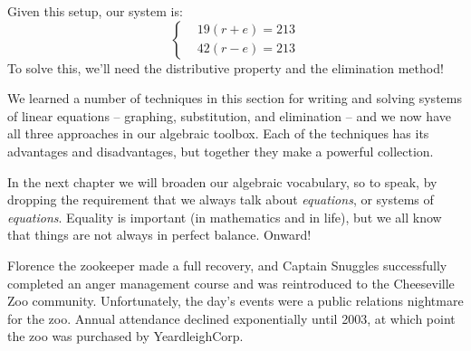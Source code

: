 %
%
%
Given this setup, our system is:
\[
\left\{%
\begin{aligned}
&19(r+e) = 213\\
&42(r-e) = 213
\end{aligned}
\right.
\]
To solve this, we'll need the distributive property and the elimination method!


\chaptersummary

We learned a number of techniques in this section for writing and solving systems of linear equations -- graphing, substitution, and elimination -- and we now have all three approaches in our algebraic toolbox. Each of the techniques has its advantages and disadvantages, but together they make a powerful collection.

In the next chapter we will broaden our algebraic vocabulary, so to speak, by dropping the requirement that we always talk about \textit{equations}, or systems of \textit{equations}. Equality is important (in mathematics and in life), but we all know that things are not always in perfect balance. Onward!

\bigskip
\begin{boxcheese}
Florence the zookeeper made a full recovery, and Captain Snuggles successfully completed an anger management course and was reintroduced to the Cheeseville Zoo community. Unfortunately, the day's events were a public relations nightmare for the zoo. Annual attendance declined exponentially until 2003, at which point the zoo was purchased by YeardleighCorp.
\end{boxcheese}

\chaptercopyright
